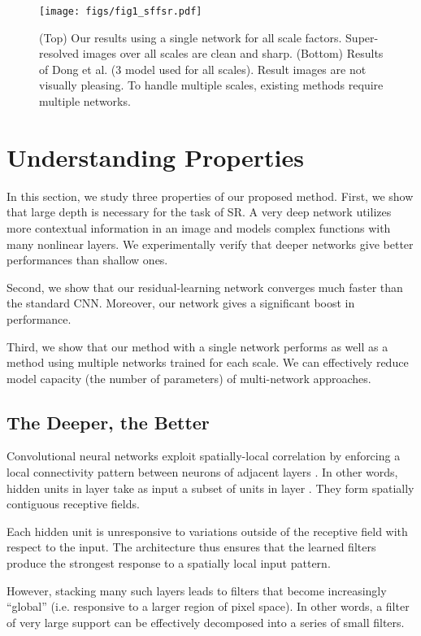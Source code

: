 \documentclass[10pt,twocolumn,letterpaper]{article}
\begin{document}
\begin{figure*}
\vspace{-.5cm}
\texttt{[image: figs/fig1\_sffsr.pdf]}
\caption{(Top) Our results using a single network for all scale factors. Super-resolved images over all scales are clean and sharp. (Bottom)  Results of Dong et al.  \cite{Dong2014} (3 model used for all scales). Result images are not visually pleasing. To handle multiple scales, existing methods require multiple networks.}
\end{figure*}




\section{Understanding Properties}

In this section, we study three properties of our proposed method. First, we show that large depth is necessary for the task of SR. A very deep network utilizes more contextual information in an image and models complex functions with many nonlinear layers. We experimentally verify that deeper networks give better performances than shallow ones. 

Second, we show that our residual-learning network converges much faster than the standard CNN. Moreover, our network gives a significant boost in performance. 

Third, we show that our method with a single network performs as well as a method using multiple networks trained for each scale. We can effectively reduce model capacity (the number of parameters) of multi-network approaches.

\subsection{The Deeper, the Better}
Convolutional neural networks exploit spatially-local correlation by enforcing a local connectivity pattern between neurons of adjacent layers \cite{Bengio-et-al-2015-Book}. In other words, hidden units in layer  take as input a subset of units in layer . They form spatially contiguous receptive fields.

Each hidden unit is unresponsive to variations outside of the receptive field with respect to the input. The architecture thus ensures that the learned filters produce the strongest response to a spatially local input pattern.

However, stacking many such layers leads to filters that become increasingly “global” (i.e. responsive to a larger region of pixel space). In other words, a filter of very large support can be effectively decomposed into a series of small filters. 
\end{document}
